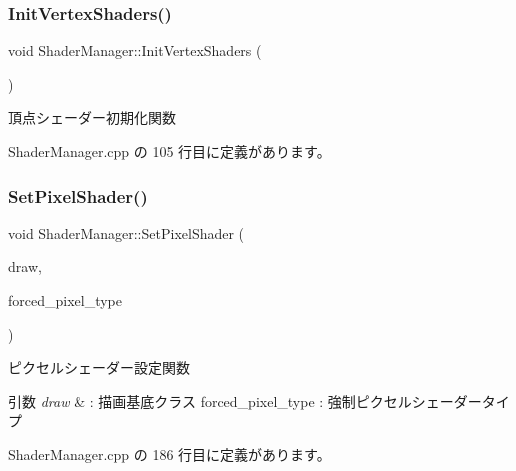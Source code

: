 \subsubsection{\texorpdfstring{Init\+Vertex\+Shaders()}{InitVertexShaders()}}
{\footnotesize\ttfamily void Shader\+Manager\+::\+Init\+Vertex\+Shaders (\begin{DoxyParamCaption}{ }\end{DoxyParamCaption})\hspace{0.3cm}{\ttfamily [private]}}



頂点シェーダー初期化関数 



 Shader\+Manager.\+cpp の 105 行目に定義があります。

\mbox{\label{class_shader_manager_a6c954293001a33fafff216ff719618d5}} 
\subsubsection{\texorpdfstring{Set\+Pixel\+Shader()}{SetPixelShader()}}
{\footnotesize\ttfamily void Shader\+Manager\+::\+Set\+Pixel\+Shader (\begin{DoxyParamCaption}\item[{\mbox{\hyperlink{class_draw_base}{Draw\+Base}} $\ast$}]{draw,  }\item[{\mbox{\hyperlink{class_shader_manager_a7d15d773b3c6a99dd7086c45c8b0be5f}{Pixel\+Shader\+Type}}}]{forced\+\_\+pixel\+\_\+type }\end{DoxyParamCaption})\hspace{0.3cm}{\ttfamily [private]}}



ピクセルシェーダー設定関数 


\begin{DoxyParams}{引数}
{\em draw} & \+: 描画基底クラス forced\+\_\+pixel\+\_\+type \+: 強制ピクセルシェーダータイプ \\
\hline
\end{DoxyParams}


 Shader\+Manager.\+cpp の 186 行目に定義があります。

\mbox{\label{class_shader_manager_ad2caed4ae50c1ca784151d0f9e50c381}} 
